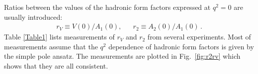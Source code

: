 Ratios between the values of the hadronic form factors expressed at $q^2=0$ are usually introduced:
\begin{eqnarray}
r_V \equiv V(0) / A_1(0), & &  r_2 \equiv A_2(0) / A_1(0) \label{rVr2_eq}\,.
\end{eqnarray}
Table \ref{Table1} lists measurements of $r_V$ and $r_2$ from several
experiments. Most of measurements assume that the $q^2$ dependence of hadronic form factors 
is given by the simple pole ansatz.
The measurements are plotted in
Fig.~\ref{fig:r2rv} which shows that they are all consistent.

